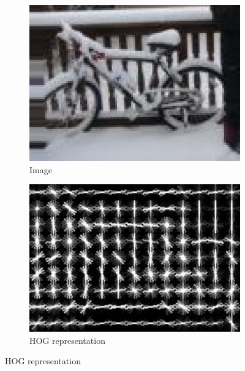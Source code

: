 \begin{figure}
\begin{subfigure}[b]{0.4\textwidth}
\centering
\includegraphics[width=\textwidth]{images/whitened_hog_image}
\caption[Image]{Image}
\label{fig:whitened_hog:image}
\end{subfigure}
%
\begin{subfigure}[b]{0.4\textwidth}
\includegraphics[width=\textwidth]{images/whitened_hog_hog}
\caption[HOG representation]{\acs{HOG} representation}
\label{fig:whitened_hog:hog}
\end{subfigure}


\end{figure}
